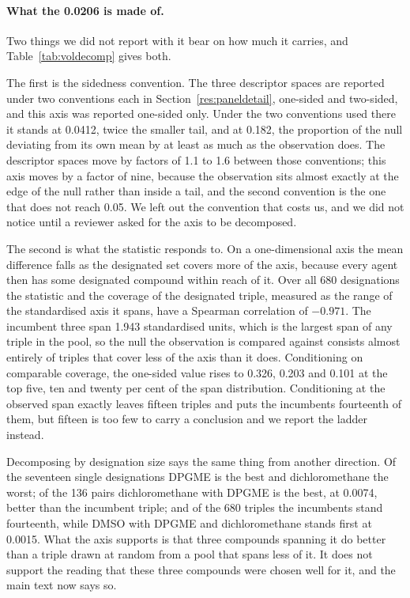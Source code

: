 \documentclass[11pt,a4paper]{article}
\begin{document}
\paragraph{What the 0.0206 is made of.} Two things we did not report with it
bear on how much it carries, and Table~\ref{tab:voldecomp} gives both.

The first is the sidedness convention. The three descriptor spaces are reported
under two conventions each in Section~\ref{res:paneldetail}, one-sided and
two-sided, and this axis was reported one-sided only. Under the two conventions
used there it stands at 0.0412, twice the smaller tail, and at 0.182, the
proportion of the null deviating from its own mean by at least as much as the
observation does. The descriptor spaces move by factors of 1.1 to 1.6 between
those conventions; this axis moves by a factor of nine, because the
observation sits almost exactly at the edge of the null rather than inside a
tail, and the second convention is the one that does not reach 0.05. We left out
the convention that costs us, and we did not notice until a reviewer asked for
the axis to be decomposed.

The second is what the statistic responds to. On a one-dimensional axis the mean
difference falls as the designated set covers more of the axis, because every
agent then has some designated compound within reach of it. Over all 680
designations the statistic and the coverage of the designated triple, measured
as the range of the standardised axis it spans, have a Spearman correlation of
$-0.971$. The incumbent three span 1.943 standardised units, which is the
largest span of any triple in the pool, so the null the observation is compared
against consists almost entirely of triples that cover less of the axis than it
does. Conditioning on comparable coverage, the one-sided value rises to 0.326,
0.203 and 0.101 at the top five, ten and twenty per cent of the span
distribution. Conditioning at the observed span exactly leaves fifteen triples
and puts the incumbents fourteenth of them, but fifteen is too few to carry a
conclusion and we report the ladder instead.

Decomposing by designation size says the same thing from another direction.
Of the seventeen single designations DPGME is the best and dichloromethane the
worst; of the 136 pairs dichloromethane with DPGME is the best, at 0.0074,
better than the incumbent triple; and of the 680 triples the incumbents stand
fourteenth, while DMSO with DPGME and dichloromethane stands first at 0.0015.
What the axis supports is that three compounds spanning it do better than a
triple drawn at random from a pool that spans less of it. It does not support
the reading that these three compounds were chosen well for it, and the main
text now says so.
\end{document}
